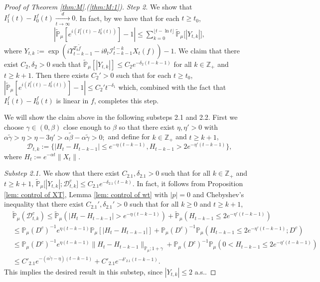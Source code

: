\documentclass[EJP]{ejpecp} %
\begin{document}
\begin{proof}[Proof of Theorem \ref{thm:M}.(\ref{thm:M:1})]
  \emph{Step 2.} We show that $I^f_1(t) - I^f_0(t) \xrightarrow[t\to \infty]{d} 0$.
  In fact,  by \cite[Lemma 3.4.3]{Durrett2010Probability} we have that for each $t\geq t_0$,
  \begin{align}
    \label{eq:PM:S:1}
    |\mathbb{\widetilde{P}}_{\mu}[e^{i (I^f_1(t) - I^f_0(t) ) }] - 1|
    \leq \sum_{k=0}^{\lfloor t-\ln t \rfloor}\mathbb{\widetilde{P}}_{\mu}\big[|Y_{t,k}|\big],
  \end{align}
  where $ Y_{t,k} := \exp(i \Upsilon_{t-k-1}^{T_{k} \tilde f} - i\theta_t \mathcal I_{t-k-1}^{t-k} X_t(f)) - 1. $
  We claim that there exist $C_2, \delta_2>0$ such that \(\widetilde {\mathbb P}_\mu [|Y_{t,k}|] \leq C_2 e^{-\delta_2 (t-k-1)}\) for all $k\in \mathbb Z_+$ and $t\geq k+1$.
  Then  there exists $C_2'>0$ such that for each  $t \geq t_0$, $|\mathbb{\widetilde{P}}_{\mu}[e^{i (I^f_1(t)- I^f_0(t))}]-1| \leq C_2't^{-\delta_1}$  which, combined with the fact that $I^f_1(t) - I^f_0(t)$ is linear in $f$, completes this step.

 We will show the claim above  in the following substeps 2.1 and 2.2.
  First we choose $\gamma \in (0,\beta)$ close enough to $\beta$ so that there exist $\eta,\eta'>0$ with $ \alpha \tilde \gamma > \eta > \eta - 3\eta' > \alpha \tilde \beta - \alpha \tilde \gamma > 0;$ and define for  $k \in \mathbb Z_+$ and $t\geq k+1$,
  \[
    \mathcal{D}_{t,k}
    :=\{|H_t-H_{t-k-1}|\leq  e^{-\eta (t-k-1)}, H_{t-k-1}> 2e^{-\eta' (t-k-1)}\},
  \]
  where $H_t := e^{-\alpha t}\|X_t\|$.

  \emph{Substep 2.1.} We show that there exist $C_{2.1},\delta_{2.1} >0$ such that for all $k \in \mathbb Z_+$ and $t\geq k+1$, $ \mathbb{\widetilde{P}}_{\mu} \big[ |Y_{t,k}| ;\mathcal{D}^c_{t,k} \big] \leq C_{2.1} e^{-\delta_{2.1} (t-k)}.$
  In fact, it follows from Proposition \ref{lem: control of XT}, Lemma \ref{lem: control of wt} with $|p|=0$ and Chebyshev's inequality that there exist $C_{2.1}', \delta_{2.1}'>0$ such that for all $k \geq 0$ and $t\geq k+1$,
  \begin{align}
    \label{eq: prob of Dtkc}
    & \mathbb{\widetilde{P}}_{\mu}(\mathcal{D}_{t,k}^c)
    \leq \mathbb{\widetilde{P}}_{\mu}(|H_t-H_{t-k-1}| > e^{-\eta (t-k-1)})+\mathbb{\widetilde{P}}_{\mu}(H_{t-k-1}\leq 2e^{-\eta'(t-k-1)}) \\
    & \leq \mathbb{P}_{\mu}(D^c)^{-1}e^{\eta(t-k-1)}\mathbb{P}_{\mu}[|H_t-H_{t-k-1}|] +  \mathbb{P}_{\mu}(D^c)^{-1} \mathbb P_\mu(H_{t-k-1}\leq 2e^{-\eta'(t-k-1)}; D^c) \\
    & \leq \mathbb{P}_{\mu}(D^c)^{-1}  e^{\eta(t-k-1)}\|H_t - H_{t-k-1}\|_{\mathbb P_\mu; 1+\gamma} + \mathbb{P}_{\mu}(D^c)^{-1} \mathbb P_\mu(0<H_{t-k-1}\leq 2e^{-\eta'(t-k-1)}) \\
    & \leq C'_{2.1} e^{-(\alpha \tilde \gamma - \eta)(t-k-1)}+C'_{2.1} e^{-\delta'_{2.1}(t-k-1)}.
  \end{align}
  This implies the desired result in this substep, since $|Y_{t,k}| \leq 2$ a.s..


\end{proof}
\end{document}

